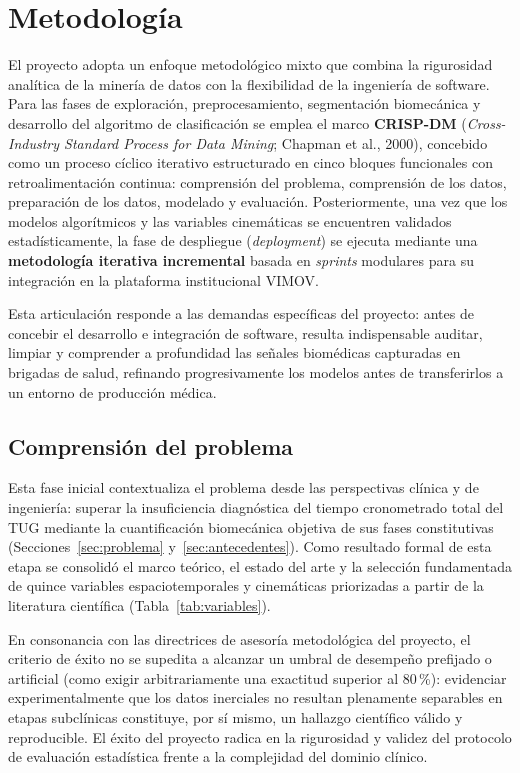\documentclass[12pt,a4paper]{article}
\begin{document}
\section{Metodología}\label{sec:metodologia}

El proyecto adopta un enfoque metodológico mixto que combina la rigurosidad analítica de la minería de datos con la flexibilidad de la ingeniería de software. Para las fases de exploración, preprocesamiento, segmentación biomecánica y desarrollo del algoritmo de clasificación se emplea el marco \textbf{CRISP-DM} (\emph{Cross-Industry Standard Process for Data Mining}; Chapman et al., 2000), concebido como un proceso cíclico iterativo estructurado en cinco bloques funcionales con retroalimentación continua: comprensión del problema, comprensión de los datos, preparación de los datos, modelado y evaluación. Posteriormente, una vez que los modelos algorítmicos y las variables cinemáticas se encuentren validados estadísticamente, la fase de despliegue (\emph{deployment}) se ejecuta mediante una \textbf{metodología iterativa incremental} basada en \emph{sprints} modulares para su integración en la plataforma institucional VIMOV.

Esta articulación responde a las demandas específicas del proyecto: antes de concebir el desarrollo e integración de software, resulta indispensable auditar, limpiar y comprender a profundidad las señales biomédicas capturadas en brigadas de salud, refinando progresivamente los modelos antes de transferirlos a un entorno de producción médica.

\subsection{Comprensión del problema}\label{sec:met-problema}

Esta fase inicial contextualiza el problema desde las perspectivas clínica y de ingeniería: superar la insuficiencia diagnóstica del tiempo cronometrado total del TUG mediante la cuantificación biomecánica objetiva de sus fases constitutivas (Secciones~\ref{sec:problema} y~\ref{sec:antecedentes}). Como resultado formal de esta etapa se consolidó el marco teórico, el estado del arte y la selección fundamentada de quince variables espaciotemporales y cinemáticas priorizadas a partir de la literatura científica (Tabla~\ref{tab:variables}).

En consonancia con las directrices de asesoría metodológica del proyecto, el criterio de éxito no se supedita a alcanzar un umbral de desempeño prefijado o artificial (como exigir arbitrariamente una exactitud superior al 80\,\%): evidenciar experimentalmente que los datos inerciales no resultan plenamente separables en etapas subclínicas constituye, por sí mismo, un hallazgo científico válido y reproducible. El éxito del proyecto radica en la rigurosidad y validez del protocolo de evaluación estadística frente a la complejidad del dominio clínico.
\end{document}
